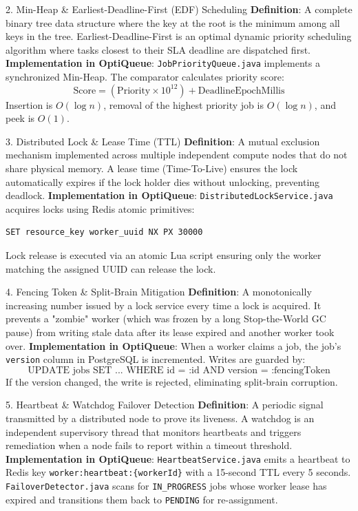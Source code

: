 \documentclass[11pt,a4paper]{article}
\begin{document}
\begin{conceptbox}{2. Min-Heap \& Earliest-Deadline-First (EDF) Scheduling}
\textbf{Definition}: A complete binary tree data structure where the key at the root is the minimum among all keys in the tree. Earliest-Deadline-First is an optimal dynamic priority scheduling algorithm where tasks closest to their SLA deadline are dispatched first.
\textbf{Implementation in OptiQueue}: \texttt{JobPriorityQueue.java} implements a synchronized Min-Heap. The comparator calculates priority score:
\[ \text{Score} = (\text{Priority} \times 10^{12}) + \text{DeadlineEpochMillis} \]
Insertion is $O(\log n)$, removal of the highest priority job is $O(\log n)$, and peek is $O(1)$.
\end{conceptbox}

\begin{conceptbox}{3. Distributed Lock \& Lease Time (TTL)}
\textbf{Definition}: A mutual exclusion mechanism implemented across multiple independent compute nodes that do not share physical memory. A lease time (Time-To-Live) ensures the lock automatically expires if the lock holder dies without unlocking, preventing deadlock.
\textbf{Implementation in OptiQueue}: \texttt{DistributedLockService.java} acquires locks using Redis atomic primitives:
\begin{lstlisting}[language=bash]
SET resource_key worker_uuid NX PX 30000
\end{lstlisting}
Lock release is executed via an atomic Lua script ensuring only the worker matching the assigned UUID can release the lock.
\end{conceptbox}

\begin{conceptbox}{4. Fencing Token \& Split-Brain Mitigation}
\textbf{Definition}: A monotonically increasing number issued by a lock service every time a lock is acquired. It prevents a "zombie" worker (which was frozen by a long Stop-the-World GC pause) from writing stale data after its lease expired and another worker took over.
\textbf{Implementation in OptiQueue}: When a worker claims a job, the job's \texttt{version} column in PostgreSQL is incremented. Writes are guarded by:
\[ \text{UPDATE jobs SET ... WHERE id = :id AND version = :fencingToken} \]
If the version changed, the write is rejected, eliminating split-brain corruption.
\end{conceptbox}

\begin{conceptbox}{5. Heartbeat \& Watchdog Failover Detection}
\textbf{Definition}: A periodic signal transmitted by a distributed node to prove its liveness. A watchdog is an independent supervisory thread that monitors heartbeats and triggers remediation when a node fails to report within a timeout threshold.
\textbf{Implementation in OptiQueue}: \texttt{HeartbeatService.java} emits a heartbeat to Redis key \texttt{worker:heartbeat:\{workerId\}} with a 15-second TTL every 5 seconds. \texttt{FailoverDetector.java} scans for \texttt{IN\_PROGRESS} jobs whose worker lease has expired and transitions them back to \texttt{PENDING} for re-assignment.
\end{conceptbox}
\end{document}
